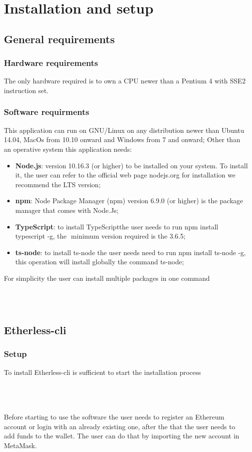 \section{Installation and setup}
\subsection{General requirements}
\subsubsection{Hardware requirements}
The only hardware required is to own a CPU newer than a Pentium 4 with SSE2 instruction set. 
\subsubsection{Software requirments }
This application can run on GNU/Linux on any distribution newer than Ubuntu 14.04, MacOs from 10.10 onward and Windows from 7 and onward; Other than an operative system this application needs: 
\begin{itemize}
	\item \textbf{Node.js}: version 10.16.3 (or higher) to be installed on your system. To install it, the user can refer to the official web page nodejs.org for installation we recommend the LTS version;
	\item \textbf{npm}: Node Package Manager (npm) version 6.9.0 (or higher) is the package manager that comes with Node.Js; 
	\item \textbf{TypeScript}: to install TypeScript\glo the user needs to run npm install typescript -g, the  minimum version required is the 3.6.5; 
	\item \textbf{ts-node}: to install ts-node the user needs need to run npm install ts-node -g, this operation will install globally the command ts-node; 
\end{itemize}
For simplicity the user can install multiple packages in one command\\
\\
\centerline{}\\
\subsection{Etherless-cli}
\subsubsection{Setup}
To install Etherless-cli is sufficient to start the installation process\\
\\
\centerline{}\\
\\
Before starting to use the software the user needs to register an Ethereum account or login with an already existing one, after the that the user needs to add funds to the wallet. The user can do that by importing the new account in MetaMask\glo.
